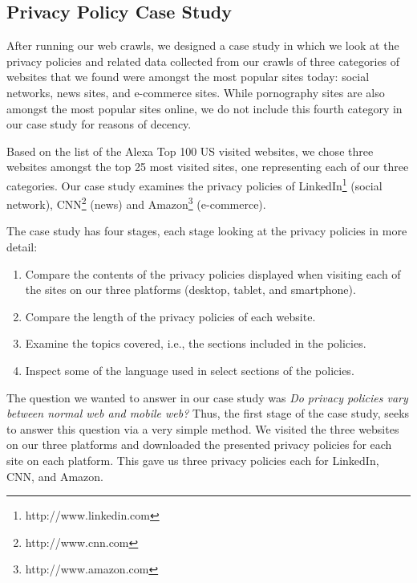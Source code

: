 \documentclass{acm_proc_article-sp}
\begin{document}
\subsection{Privacy Policy Case Study}
After running our web crawls, we designed a case study in which we look at the privacy policies and related data collected from our crawls of three categories of websites that we found were amongst the most popular sites today: social networks, news sites, and e-commerce sites. While pornography sites are also amongst the most popular sites online, we do not include this fourth category in our case study for reasons of decency. 

Based on the list of the Alexa Top 100 US visited websites, we chose three websites amongst the top 25 most visited sites, one representing each of our three categories. Our case study examines the privacy policies of LinkedIn\footnote{http://www.linkedin.com} (social network), CNN\footnote{http://www.cnn.com} (news) and Amazon\footnote{http://www.amazon.com} (e-commerce).

The case study has four stages, each stage looking at the privacy policies in more detail:
\begin{enumerate}
\item Compare the contents of the privacy policies displayed when visiting each of the sites on our three platforms (desktop, tablet, and smartphone).
\item Compare the length of the privacy policies of each website.
\item Examine the topics covered, i.e., the sections included in the policies.
\item Inspect some of the language used in select sections of the policies.
\end{enumerate}

The question we wanted to answer in our case study was \emph{Do privacy policies vary between normal web and mobile web?} Thus, the first stage of the case study, seeks to answer this question via a very simple method. We visited the three websites on our three platforms and downloaded the presented privacy policies for each site on each platform. This gave us three privacy policies each for LinkedIn, CNN, and Amazon. 
\end{document}
